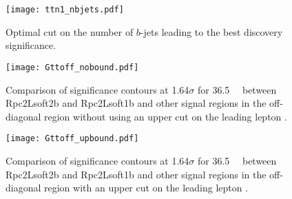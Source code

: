 \begin{figure} 
\centering  
\texttt{[image: ttn1\_nbjets.pdf]} 
\caption{Optimal cut on the number of $b$-jets leading to the best discovery significance.}
\label{fig:SR_Gtt_bjets}
\end{figure}  



\begin{figure} 
\centering  
\texttt{[image: Gttoff\_nobound.pdf]} 
\caption{Comparison of significance contours at 1.64$\sigma$ for 36.5~\ifb~ between Rpc2Lsoft2b and Rpc2Lsoft1b and other signal regions in the off-diagonal region without using an upper cut on the leading lepton \pt.}
\label{fig:SR_ptbound.no}
\end{figure}  


\begin{figure} 
\centering  
\texttt{[image: Gttoff\_upbound.pdf]} 
\caption{Comparison of significance contours at 1.64$\sigma$ for 36.5~\ifb~ between Rpc2Lsoft2b and Rpc2Lsoft1b and other signal regions in the off-diagonal region with an upper cut on the leading lepton \pt.}
\label{fig:SR_ptbound.yes}
\end{figure}  




